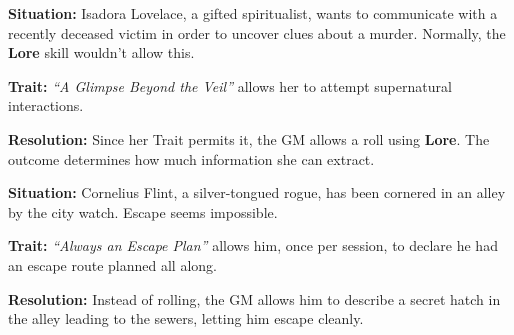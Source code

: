 \begin{WyrdExample}
	\textbf{Situation:} Isadora Lovelace, a gifted spiritualist, wants to communicate with a recently deceased victim in order to uncover clues about a murder. Normally, the \textbf{Lore} skill wouldn’t allow this.

	\noindent\textbf{Trait:} \emph{“A Glimpse Beyond the Veil”} allows her to attempt supernatural interactions.

	\noindent\textbf{Resolution:} Since her Trait permits it, the GM allows a roll using \textbf{Lore}. The outcome determines how much information she can extract.
\end{WyrdExample}

\begin{WyrdExample}
	\textbf{Situation:} Cornelius Flint, a silver-tongued rogue, has been cornered in an alley by the city watch. Escape seems impossible.

	\noindent\textbf{Trait:} \emph{“Always an Escape Plan”} allows him, once per session, to declare he had an escape route planned all along.

	\noindent\textbf{Resolution:} Instead of rolling, the GM allows him to describe a secret hatch in the alley leading to the sewers, letting him escape cleanly.
\end{WyrdExample}
 
\BeginBoxPage
{}


